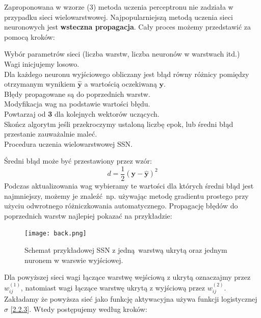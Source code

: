 \documentclass{article}
\renewcommand{\vec}[1]{\mathbf{#1}}
\begin{document}
Zaproponowana w wzorze (3) metoda uczenia perceptronu nie zadziała w przypadku sieci
wielowarstwowej. Najpopularniejszą metodą uczenia sieci neuronowych 
jest \textbf{wsteczna propagacja}. Cały proces możemy przedstawić za pomocą kroków:

{\LinesNumbered
\begin{algorithm}[H]
 Wybór parametrów sieci (liczba warstw, liczba neuronów w warstwach itd.)\\
 Wagi inicjujemy losowo.\\
 Dla każdego neuronu wyjściowego obliczany jest błąd równy różnicy pomiędzy otrzymanym
 wynikiem $\hat{\vec{y}}$ a wartością oczekiwaną $\vec{y}$.\\
 Błędy propagowane są do poprzednich warstw.\\
 Modyfikacja wag na podstawie wartości błędu.\\
 Powtarzaj od \textbf{3} dla kolejnych wektorów uczących.\\
 Skończ algorytm jeśli przekroczymy ustaloną liczbę epok, lub średni błąd przestanie zauważalnie
 maleć.\\
 \caption{Procedura uczenia wielowarstwowej SSN.}
\end{algorithm}}
Średni błąd może być przestawiony przez wzór:
\begin{equation}
\label{wz:4}
	d = \frac{1}{2}(\vec{y} - \hat{\vec{y}})^2
\end{equation}
Podczas aktualizowania wag wybieramy te wartości dla których średni błąd jest najmniejszy, możemy
je znaleźć np. używając metodę gradientu prostego przy użyciu odwrotnego różniczkowania
automatycznego.
Propagację błędów do poprzednich warstw najlepiej pokazać na przykładzie:
\begin{figure}[H]
\centering
\texttt{[image: back.png]}
\caption{Schemat przykładowej SSN z jedną warstwą ukrytą oraz jednym nuronem w warswie
wyjściowej.}
\end{figure}
Dla powyższej sieci wagi łączące warstwę wejściową z ukrytą oznaczajmy przez 
$w_{ij}^{(1)}$, natomiast wagi łączące warstwę ukrytą z wyjściową przez 
$w_{ij}^{(2)}$. Zakładamy że powyższa sieć jako
funkcję aktywacyjna używa funkcji logistycznej $\sigma$ [\hyperref[sec:fa]{2.2.3}].
Wtedy postępujemy według kroków:\\
\end{document}
